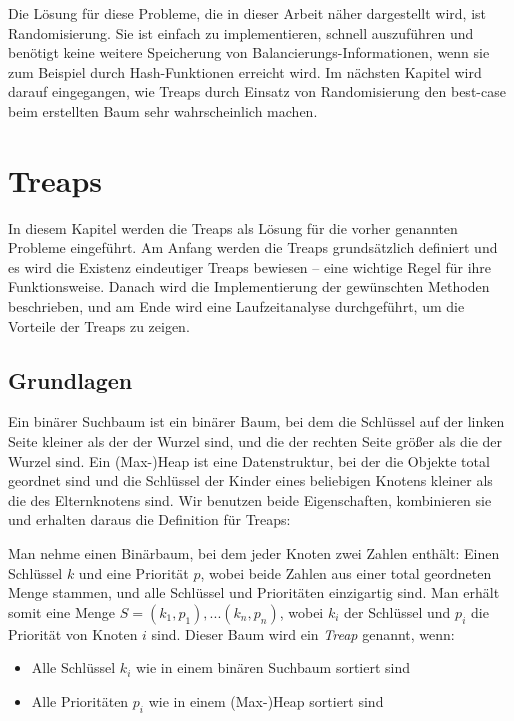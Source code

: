 \documentclass[a4paper]{scrreprt}
\theoremstyle{definition}
\begin{document}
Die Lösung für diese Probleme, die in dieser Arbeit näher dargestellt wird, ist Randomisierung.
Sie ist einfach zu implementieren, schnell auszuführen und benötigt keine weitere Speicherung von Balancierungs-Informationen, wenn sie zum Beispiel durch Hash-Funktionen erreicht wird.
Im nächsten Kapitel wird darauf eingegangen, wie Treaps durch Einsatz von Randomisierung den best-case beim erstellten Baum sehr wahrscheinlich machen.

\chapter{Treaps}
\label{sec:treaps}

In diesem Kapitel werden die Treaps als Lösung für die vorher genannten Probleme eingeführt.
Am Anfang werden die Treaps grundsätzlich definiert und es wird die Existenz eindeutiger Treaps bewiesen -- eine wichtige Regel für ihre Funktionsweise.
Danach wird die Implementierung der gewünschten Methoden beschrieben, und am Ende wird eine Laufzeitanalyse durchgeführt, um die Vorteile der Treaps zu zeigen.

\section{Grundlagen}
\label{sec:treapsbasics}

Ein binärer Suchbaum ist ein binärer Baum, bei dem die Schlüssel auf der linken Seite kleiner als der der Wurzel sind, und die der rechten Seite größer als die der Wurzel sind.
Ein (Max-)Heap ist eine Datenstruktur, bei der die Objekte total geordnet sind und die Schlüssel der Kinder eines beliebigen Knotens kleiner als die des Elternknotens sind.
Wir benutzen beide Eigenschaften, kombinieren sie und erhalten daraus die Definition für Treaps:

Man nehme einen Binärbaum, bei dem jeder Knoten zwei Zahlen enthält: Einen Schlüssel $k$ und eine Priorität $p$, wobei beide Zahlen aus einer total geordneten Menge stammen, und alle Schlüssel und Prioritäten einzigartig sind. Man erhält somit eine Menge $S = {(k_1, p_1), ... (k_n, p_n)}$, wobei $k_i$ der Schlüssel und $p_i$ die Priorität von Knoten $i$ sind. Dieser Baum wird ein \emph{Treap} genannt, wenn:

\begin{itemize}
\item Alle Schlüssel $k_i$ wie in einem binären Suchbaum sortiert sind
\item Alle Prioritäten $p_i$ wie in einem (Max-)Heap sortiert sind
\end{itemize}
\end{document}
